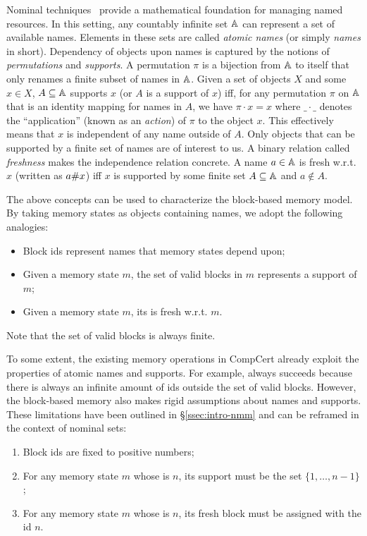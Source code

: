 Nominal techniques~\cite{pitts-nominal,gabby2002} provide a
mathematical foundation for managing named resources. 
%
In this setting, any countably infinite set $\mathbb{A}$ can
represent a set of available names. Elements in these sets are called
\emph{atomic names} (or simply \emph{names} in short). Dependency of
objects upon names is captured by the notions of \emph{permutations}
and \emph{supports}. A permutation $\pi$ is a bijection from
$\mathbb{A}$ to itself that only renames a finite subset of names in
$\mathbb{A}$. Given a set of objects $X$ and some $x \in X$, $A
\subseteq \mathbb{A}$ supports $x$ (or $A$ is a support of $x$) iff,
for any permutation $\pi$ on $\mathbb{A}$ that is an identity mapping
for names in $A$, we have $\pi \cdot x = x$ where $\_ \cdot \_$
denotes the ``application'' (known as an \emph{action}) of $\pi$ to the
object $x$. This effectively means that $x$ is independent of any name
outside of $A$.
%
Only objects that can be supported by a finite set of names are of
interest to us.
%
A binary relation called \emph{freshness} makes the independence
relation concrete. A name $a\in \mathbb{A}$ is fresh w.r.t. $x$
(written as $a \# x$) iff $x$ is supported by some finite set $A
\subseteq \mathbb{A}$ and $a \not\in A$.

The above concepts can be used to characterize the block-based
memory model. By taking memory states as objects containing names, 
we adopt the following analogies:
%
\begin{itemize}\itemsep 0pt
\item Block ids represent names that memory states depend upon;
\item Given a memory state $m$, the set of valid blocks in $m$
  represents a support of $m$;
\item Given a memory state $m$, its \nextblock is fresh w.r.t. $m$.
\end{itemize}
%
Note that the set of valid blocks is always finite.

To some extent, the
existing memory operations in CompCert already exploit the properties
of atomic names and supports. For example,
 always succeeds because there is always an infinite amount
of ids outside the set of valid blocks.
%
However, 
the block-based memory also makes rigid assumptions
about names and supports.
These limitations have been outlined in \S\ref{ssec:intro-nmm}
and can be reframed in the context of nominal sets:
%
\begin{enumerate} \itemsep 0pt
\item Block ids are fixed to positive numbers;
\item For any memory state $m$ whose \nextblock is $n$, its support
  must be the set $\{1,\ldots,n-1\}$;
\item For any memory state $m$ whose \nextblock is $n$, its fresh
  block must be assigned with the id $n$.
\end{enumerate}


